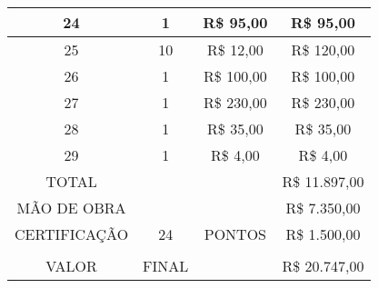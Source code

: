 \begin{table}[h!]
\begin{tabular}{|c|c|c|c|}
24           & 1     & R\$ 95,00    & R\$ 95,00     \\ \hline
25           & 10    & R\$ 12,00    & R\$ 120,00    \\ \hline
26           & 1     & R\$ 100,00   & R\$ 100,00    \\ \hline
27           & 1     & R\$ 230,00   & R\$ 230,00    \\ \hline
28           & 1     & R\$ 35,00    & R\$ 35,00     \\ \hline
29           & 1     & R\$ 4,00     & R\$ 4,00      \\ \hline
TOTAL        &       &              & R\$ 11.897,00 \\ \hline
MÃO DE OBRA  &       &              & R\$ 7.350,00  \\ \hline
CERTIFICAÇÃO & 24    & PONTOS       & R\$ 1.500,00  \\ \hline
             &       &              &               \\ \hline
VALOR        & FINAL &              & R\$ 20.747,00 \\ \hline
\end{tabular}
\end{table}